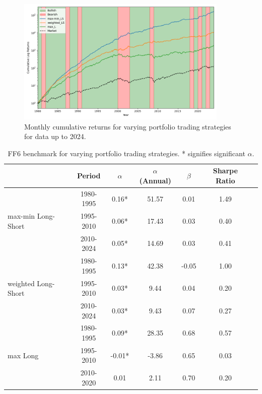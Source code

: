 \documentclass{article}
\begin{document}
\begin{figure}[H]
    \centering
    \includegraphics[width=0.9\textwidth]{2024_plot5_portfolio_strategy_comparison.png}
    \caption{Monthly cumulative returns for varying portfolio trading strategies for data up to 2024.}
    \label{fig:strategy_comp}
\end{figure}

\begin{table}[h]
    \centering
    \begin{tabular}{lcccccc}
        \toprule
        & Period & $\alpha$ & $\alpha$ (Annual) & $\beta$ & Sharpe Ratio \\
        \midrule
        \multirow{3}{*}{max-min Long-Short} & 1980-1995 & 0.16* & 51.57 & 0.01 & 1.49 \\
                                            & 1995-2010 & 0.06* & 17.43 & 0.03 & 0.40 \\
                                            & 2010-2024 & 0.05* & 14.69 & 0.03 & 0.41 \\
        \midrule
        \multirow{3}{*}{weighted Long-Short} & 1980-1995 & 0.13* & 42.38 & -0.05 & 1.00 \\
                                             & 1995-2010 & 0.03* & 9.44 & 0.04 & 0.20 \\
                                             & 2010-2024 & 0.03* & 9.43 & 0.07 & 0.27 \\
        \midrule
        \multirow{3}{*}{max Long} & 1980-1995 & 0.09* & 28.35 & 0.68 & 0.57 \\
                                  & 1995-2010 & -0.01* & -3.86 & 0.65 & 0.03 \\
                                  & 2010-2020 & 0.01 & 2.11 & 0.70 & 0.20 \\
        \bottomrule
    \end{tabular}
    \caption{FF6 benchmark for varying portfolio trading strategies. * signifies significant $\alpha$.}
    \label{tab:portfolio_strategy_comparison}
\end{table}
\end{document}
